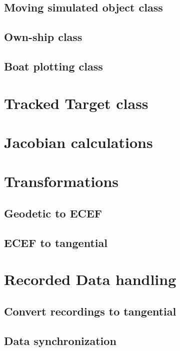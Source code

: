 \subsection{Moving simulated object class}

\subsection{Own-ship class}

\subsection{Boat plotting class}

\section{Tracked Target class}


\section{Jacobian calculations}

\section{Transformations}
\subsection{Geodetic to ECEF}

\subsection{ECEF to tangential}


\section{Recorded Data handling}
\subsection{Convert recordings to tangential}

\subsection{Data synchronization}

